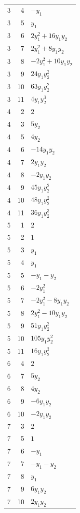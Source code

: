 \documentclass[10pt,a4paper]{article}
\begin{document}
{\begin{longtable}{rrp{125mm}}
3 & 4 & $- y_{1}$\\
3 & 5 & $y_{1}$\\
3 & 6 & $2 y_{1}^{2} + 16 y_{1} y_{2}$\\
3 & 7 & $2 y_{1}^{2} + 8 y_{1} y_{2}$\\
3 & 8 & $- 2 y_{1}^{2} + 10 y_{1} y_{2}$\\
3 & 9 & $24 y_{1} y_{2}^{2}$\\
3 & 10 & $63 y_{1} y_{2}^{2}$\\
3 & 11 & $4 y_{1} y_{2}^{3}$\\
4 & 2 & $2$\\
4 & 3 & $5 y_{2}$\\
4 & 5 & $4 y_{2}$\\
4 & 6 & $- 14 y_{1} y_{2}$\\
4 & 7 & $2 y_{1} y_{2}$\\
4 & 8 & $- 2 y_{1} y_{2}$\\
4 & 9 & $45 y_{1} y_{2}^{2}$\\
4 & 10 & $48 y_{1} y_{2}^{2}$\\
4 & 11 & $36 y_{1} y_{2}^{3}$\\
5 & 1 & $2$\\
5 & 2 & $1$\\
5 & 3 & $y_{1}$\\
5 & 4 & $y_{1}$\\
5 & 5 & $- y_{1} - y_{2}$\\
5 & 6 & $- 2 y_{1}^{2}$\\
5 & 7 & $- 2 y_{1}^{2} - 8 y_{1} y_{2}$\\
5 & 8 & $2 y_{1}^{2} - 10 y_{1} y_{2}$\\
5 & 9 & $51 y_{1} y_{2}^{2}$\\
5 & 10 & $105 y_{1} y_{2}^{2}$\\
5 & 11 & $16 y_{1} y_{2}^{3}$\\
6 & 4 & $2$\\
6 & 7 & $5 y_{2}$\\
6 & 8 & $4 y_{2}$\\
6 & 9 & $- 6 y_{1} y_{2}$\\
6 & 10 & $- 2 y_{1} y_{2}$\\
7 & 3 & $2$\\
7 & 5 & $1$\\
7 & 6 & $- y_{1}$\\
7 & 7 & $- y_{1} - y_{2}$\\
7 & 8 & $y_{1}$\\
7 & 9 & $6 y_{1} y_{2}$\\
7 & 10 & $2 y_{1} y_{2}$\\

\end{longtable}}
\end{document}
